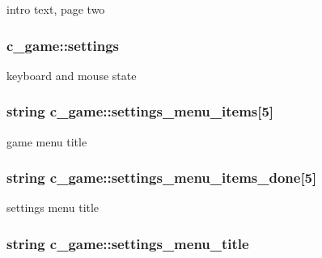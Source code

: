 intro text, page two \hypertarget{classc__game_aa52e67cd5e61fd952434abd0b761136c}{
\subsubsection[{settings}]{ c\-\_\-game\-::settings\hspace{0.3cm}{\ttfamily [protected]}}}\label{classc__game_aa52e67cd5e61fd952434abd0b761136c}
keyboard and mouse state \hypertarget{classc__game_a5d210224b8d881f8aa2d01d8adf981fd}{
\subsubsection[{settings\-\_\-menu\-\_\-items}]{\setlength{\rightskip}{0pt plus 5cm}string c\-\_\-game\-::settings\-\_\-menu\-\_\-items\mbox{[}5\mbox{]}\hspace{0.3cm}{\ttfamily [protected]}}}\label{classc__game_a5d210224b8d881f8aa2d01d8adf981fd}
game menu title \hypertarget{classc__game_afc77c56ed33f68e53f9fec7ed2c17c14}{
\subsubsection[{settings\-\_\-menu\-\_\-items\-\_\-done}]{\setlength{\rightskip}{0pt plus 5cm}string c\-\_\-game\-::settings\-\_\-menu\-\_\-items\-\_\-done\mbox{[}5\mbox{]}\hspace{0.3cm}{\ttfamily [protected]}}}\label{classc__game_afc77c56ed33f68e53f9fec7ed2c17c14}
settings menu title \hypertarget{classc__game_aaa69654c55f2de1d29c769fa7045726f}{
\subsubsection[{settings\-\_\-menu\-\_\-title}]{\setlength{\rightskip}{0pt plus 5cm}string c\-\_\-game\-::settings\-\_\-menu\-\_\-title\hspace{0.3cm}{\ttfamily [protected]}}}\label{classc__game_aaa69654c55f2de1d29c769fa7045726f}
